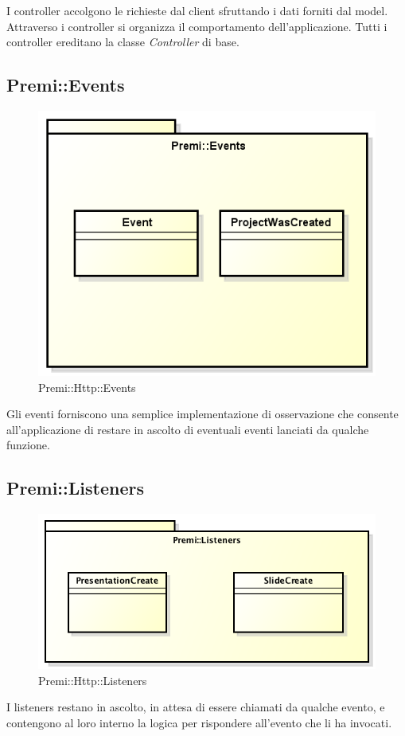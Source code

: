 I controller accolgono le richieste dal client sfruttando i dati forniti dal model. Attraverso i controller si organizza il comportamento dell'applicazione. Tutti i controller ereditano la classe \textit{Controller} di base.


\newpage
\subsection{Premi::Events}
\begin{figure}[h]
	\centering
	\includegraphics[width=0.7\linewidth]{img/premi_back_end_events}
	\caption[Premi::Events]{Premi::Http::Events}
	\label{fig:premi_back_end_events}
\end{figure}

Gli eventi forniscono una semplice implementazione di osservazione che consente all'applicazione di restare in ascolto di eventuali eventi lanciati da qualche funzione.


\newpage
\subsection{Premi::Listeners}
\begin{figure}[h]
	\centering
	\includegraphics[width=0.7\linewidth]{img/back_end_premi_listeners}
	\caption[Premi::Http::Listeners]{Premi::Http::Listeners}
	\label{fig:back_end_premi_listeners}
\end{figure}

I listeners restano in ascolto, in attesa di essere chiamati da qualche evento, e contengono al loro interno la logica per rispondere  all'evento che li ha invocati. 
